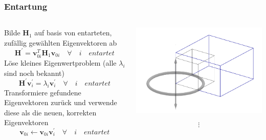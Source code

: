 \documentclass[ngerman, aspectratio=169]{beamer}
\begin{document}
	\begin{frame}
        \frametitle{Entartung}

		\begin{columns}
			\begin{column}{0.59\textwidth}

				Bilde $\bm H_1$ auf basis von entarteten, zufällig gewählten Eigenvektoren ab
				\begin{equation*}
					\bm H^\prime = \bm v_{0i}^T \bm H_1 \bm v_{0i} \quad \forall \quad i \quad entartet
				\end{equation*}
				Löse kleines Eigenwertproblem (alle $\lambda_i$ sind noch bekannt)
				\begin{equation*}
					\bm H^\prime \bm v_{i}^\prime = \lambda_{i} \bm v_i^\prime \quad \forall \quad i \quad entartet
				\end{equation*}
				Transformiere gefundene Eigenvektoren zurück und verwende diese als die neuen, korrekten Eigenvektoren
				\begin{equation*}
					\bm v_{0i} \gets \bm v_{0i} \bm v_{i}^\prime  \quad \forall \quad i \quad entartet
				\end{equation*}
			\end{column}
			\begin{column}{0.40\textwidth}
				\begin{center}
					\includegraphics[scale=0.25]{img/entartung.png}
				\end{center}
				\begin{equation*}
					\vdots
				\end{equation*}
				\begin{center}

\end{center}
\end{column}
\end{columns}
\end{frame}
\end{document}
